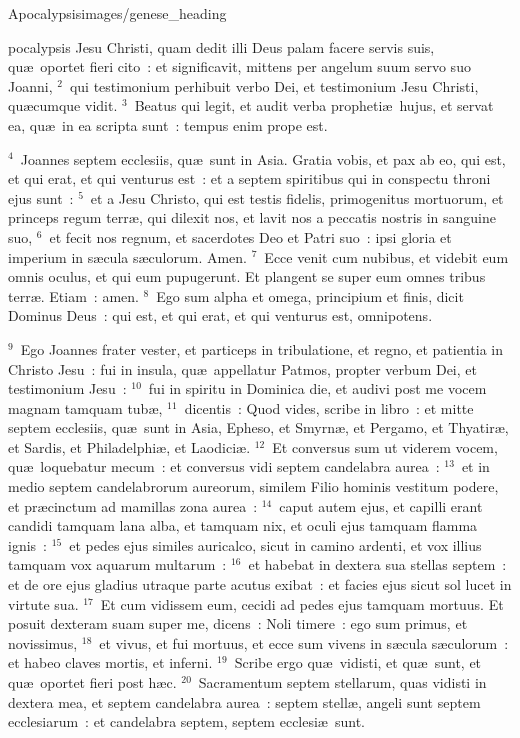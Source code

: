 {Apocalypsis}{images/genese_heading}


\bchapter
{}pocalypsis Jesu Christi, quam dedit illi Deus palam facere servis suis, qu\ae\ oportet fieri cito~: et significavit, mittens per angelum suum servo suo Joanni,
${}^{2}$~qui testimonium perhibuit verbo Dei, et testimonium Jesu Christi, qu\ae cumque vidit.
${}^{3}$~Beatus qui legit, et audit verba propheti\ae\ hujus, et servat ea, qu\ae\ in ea scripta sunt~: tempus enim prope est.


${}^{4}$~Joannes septem ecclesiis, qu\ae\ sunt in Asia. Gratia vobis, et pax ab eo, qui est, et qui erat, et qui venturus est~: et a septem spiritibus qui in conspectu throni ejus sunt~:
${}^{5}$~et a Jesu Christo, qui est testis fidelis, primogenitus mortuorum, et princeps regum terr\ae , qui dilexit nos, et lavit nos a peccatis nostris in sanguine suo,
${}^{6}$~et fecit nos regnum, et sacerdotes Deo et Patri suo~: ipsi gloria et imperium in s\ae cula s\ae culorum. Amen.
${}^{7}$~Ecce venit cum nubibus, et videbit eum omnis oculus, et qui eum pupugerunt. Et plangent se super eum omnes tribus terr\ae . Etiam~: amen.
${}^{8}$~Ego sum alpha et omega, principium et finis, dicit Dominus Deus~: qui est, et qui erat, et qui venturus est, omnipotens.


${}^{9}$~Ego Joannes frater vester, et particeps in tribulatione, et regno, et patientia in Christo Jesu~: fui in insula, qu\ae\ appellatur Patmos, propter verbum Dei, et testimonium Jesu~:
${}^{10}$~fui in spiritu in Dominica die, et audivi post me vocem magnam tamquam tub\ae ,
${}^{11}$~dicentis~: Quod vides, scribe in libro~: et mitte septem ecclesiis, qu\ae\ sunt in Asia, Epheso, et Smyrn\ae , et Pergamo, et Thyatir\ae , et Sardis, et Philadelphi\ae , et Laodici\ae .
${}^{12}$~Et conversus sum ut viderem vocem, qu\ae\ loquebatur mecum~: et conversus vidi septem candelabra aurea~:
${}^{13}$~et in medio septem candelabrorum aureorum, similem Filio hominis vestitum podere, et pr\ae cinctum ad mamillas zona aurea~:
${}^{14}$~caput autem ejus, et capilli erant candidi tamquam lana alba, et tamquam nix, et oculi ejus tamquam flamma ignis~:
${}^{15}$~et pedes ejus similes auricalco, sicut in camino ardenti, et vox illius tamquam vox aquarum multarum~:
${}^{16}$~et habebat in dextera sua stellas septem~: et de ore ejus gladius utraque parte acutus exibat~: et facies ejus sicut sol lucet in virtute sua.
${}^{17}$~Et cum vidissem eum, cecidi ad pedes ejus tamquam mortuus. Et posuit dexteram suam super me, dicens~: Noli timere~: ego sum primus, et novissimus,
${}^{18}$~et vivus, et fui mortuus, et ecce sum vivens in s\ae cula s\ae culorum~: et habeo claves mortis, et inferni.
${}^{19}$~Scribe ergo qu\ae\ vidisti, et qu\ae\ sunt, et qu\ae\ oportet fieri post h\ae c.
${}^{20}$~Sacramentum septem stellarum, quas vidisti in dextera mea, et septem candelabra aurea~: septem stell\ae , angeli sunt septem ecclesiarum~: et candelabra septem, septem ecclesi\ae\ sunt.

